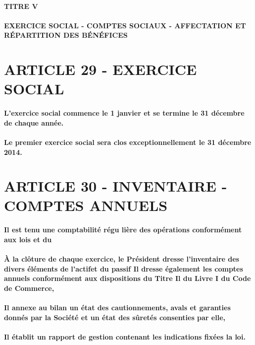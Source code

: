 \documentclass[a4paper, 11pt]{article}
\begin{document}
\paragraph{
  TITRE V\\
  \\
  EXERCICE SOCIAL - COMPTES SOCIAUX - AFFECTATION ET RÉPARTITION DES BÉNÉFICES
}

\section*{ARTICLE 29 - EXERCICE SOCIAL}

\paragraph{
  L'exercice social commence le 1 janvier et se termine le 31 décembre de chaque année.
}

\paragraph{
  Le premier exercice social sera clos exceptionnellement le 31 décembre 2014.
}

\section*{ARTICLE 30 - INVENTAIRE - COMPTES ANNUELS}

\paragraph{
  Il est tenu une comptabilité régu lière des opérations conformément aux lois et du
}
\paragraph{
  À la clôture de chaque exercice, le Président dresse l'inventaire des divers éléments de l'actifet du passif Il dresse également les comptes annuels conformément aux dispositions du Titre Il du Livre I du Code de Commerce,
}
\paragraph{
  Il annexe au bilan un état des cautionnements, avals et garanties donnés par la Société et un état des sûretés consenties par elle,
}
\paragraph{
  Il établit un rapport de gestion contenant les indications fixées la loi.
}
\end{document}
